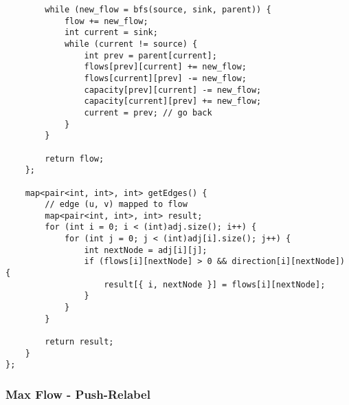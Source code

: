 \begin{center}
\begin{minipage}[t]{0.45\linewidth}
\begin{lstlisting}
        while (new_flow = bfs(source, sink, parent)) {
            flow += new_flow;
            int current = sink;
            while (current != source) {
                int prev = parent[current];
                flows[prev][current] += new_flow;
                flows[current][prev] -= new_flow;
                capacity[prev][current] -= new_flow;
                capacity[current][prev] += new_flow;
                current = prev; // go back
            }
        }

        return flow;
    };

    map<pair<int, int>, int> getEdges() {
        // edge (u, v) mapped to flow
        map<pair<int, int>, int> result;
        for (int i = 0; i < (int)adj.size(); i++) {
            for (int j = 0; j < (int)adj[i].size(); j++) {
                int nextNode = adj[i][j];
                if (flows[i][nextNode] > 0 && direction[i][nextNode]) {
                    result[{ i, nextNode }] = flows[i][nextNode];
                }
            }
        }

        return result;
    }
};
\end{lstlisting}
\end{minipage}
\end{center}

\newpage

\subsubsection{Max Flow - Push-Relabel}

